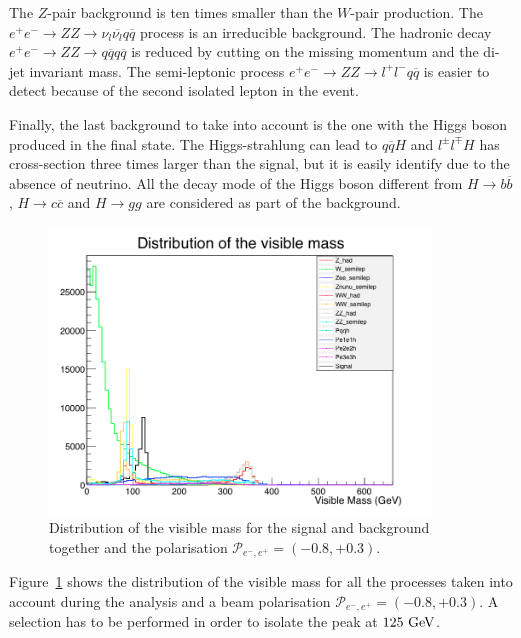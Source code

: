     The $Z$-pair background is ten times smaller than the $W$-pair production.
    The  $e^+e^- \rightarrow ZZ \rightarrow \nu_{l}\overline{\nu_{l}}q \overline{q}$ process is an irreducible background.
    The hadronic decay $e^+e^- \rightarrow ZZ \rightarrow q\overline{q} q\overline{q}$ is reduced by cutting on the missing momentum and the di-jet invariant mass.
    The semi-leptonic process $e^+e^- \rightarrow ZZ \rightarrow l^+l^- q\overline{q}$ is easier to detect because of the second isolated lepton in the event.

    Finally, the last background to take into account is the one with the Higgs boson produced in the final state.
    The Higgs-strahlung can lead to $q\overline{q}H$ and $l^{\pm}l^{\mp}H$ has cross-section three times larger than the signal, but it is easily identify due to the absence of neutrino.
    All the decay mode of the Higgs boson different from $H \rightarrow b\overline{b}$, $H \rightarrow c\overline{c}$ and $H \rightarrow gg$ are considered as part of the background.

    \begin{figure}[!h]
      \centering
      \includegraphics[width = 0.9\textwidth]{Pictures/Higgs/mVis_all.png}
      \caption{Distribution of the visible mass for the signal and background together and the polarisation $\mathcal{P}_{e^-,e^+} = (-0.8,+0.3)$.}
      \label{fig:mVisAll}
    \end{figure}

    Figure~\ref{fig:mVisAll} shows the distribution of the visible mass for all the processes taken into account during the analysis and a beam polarisation $\mathcal{P}_{e^-,e^+} = (-0.8,+0.3)$.
    A selection has to be performed in order to isolate the peak at $125~\rm{GeV}$.

